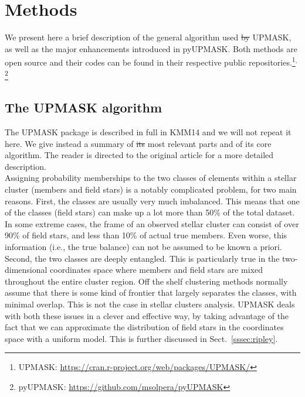 \documentclass[draft]{aa}
\providecommand{\DIFaddtex}[1]{{\protect\color{blue}\uwave{#1}}} %
\providecommand{\DIFdeltex}[1]{{\protect\color{red}\sout{#1}}}                      %
\providecommand{\DIFaddbegin}{} %
\providecommand{\DIFaddend}{} %
\providecommand{\DIFdelbegin}{} %
\providecommand{\DIFdelend}{} %
\providecommand{\DIFadd}[1]{\texorpdfstring{\DIFaddtex{#1}}{#1}} %
\providecommand{\DIFdel}[1]{\texorpdfstring{\DIFdeltex{#1}}{}} %
\newcommand{\DIFscaledelfig}{0.5}
\newlength{\DIFdelgraphicswidth} %
\newlength{\DIFdelgraphicsheight} %
\newcommand{\DIFaddincludegraphics}[2][]{{\color{blue}\fbox{\DIFOincludegraphics[#1]{#2}}}} %
\newcommand{\DIFdelincludegraphics}[2][]{%
\sbox{\DIFdelgraphicsbox}{\DIFOincludegraphics[#1]{#2}}%
\settoboxwidth{\DIFdelgraphicswidth}{\DIFdelgraphicsbox} %
\settoboxtotalheight{\DIFdelgraphicsheight}{\DIFdelgraphicsbox} %
\scalebox{\DIFscaledelfig}{%
\parbox[b]{\DIFdelgraphicswidth}{\usebox{\DIFdelgraphicsbox}\\[-\baselineskip] \rule{\DIFdelgraphicswidth}{0em}}\llap{\resizebox{\DIFdelgraphicswidth}{\DIFdelgraphicsheight}{%
\setlength{\unitlength}{\DIFdelgraphicswidth}%
\begin{picture}(1,1)%
\thicklines\linethickness{2pt} %
{\color[rgb]{1,0,0}\put(0,0){\framebox(1,1){}}}%
{\color[rgb]{1,0,0}\put(0,0){\line( 1,1){1}}}%
{\color[rgb]{1,0,0}\put(0,1){\line(1,-1){1}}}%
\end{picture}%
}\hspace*{3pt}}} %
} %
\DeclareRobustCommand{\DIFaddbegin}{\DIFOaddbegin \let\includegraphics\DIFaddincludegraphics} %
\DeclareRobustCommand{\DIFaddend}{\DIFOaddend \let\includegraphics\DIFOincludegraphics} %
\DeclareRobustCommand{\DIFdelbegin}{\DIFOdelbegin \let\includegraphics\DIFdelincludegraphics} %
\DeclareRobustCommand{\DIFdelend}{\DIFOaddend \let\includegraphics\DIFOincludegraphics} %
\begin{document}
\section{Methods}
 \label{sec:methods}

 We present here a brief description of the general algorithm used \DIFdelbegin \DIFdel{by }\DIFdelend \DIFaddbegin \DIFadd{in }\DIFaddend UPMASK,
 as well as the major enhancements introduced in pyUPMASK.
 Both methods are open source and their codes can be found in their
 respective public repositories.\footnote{UPMASK: 
 \DIFdelbegin %
\DIFdelend \DIFaddbegin \url{https://cran.r-project.org/web/packages/UPMASK/}\DIFaddend }$^{,}$\footnote{pyUPMASK:
 \url{https://github.com/msolpera/pyUPMASK}} %



\subsection{The UPMASK algorithm}
 \label{ssec:upmask}

 The UPMASK package is described in full in KMM14 and we will not repeat it
 here. We give instead a summary of \DIFdelbegin \DIFdel{its }\DIFdelend \DIFaddbegin \DIFadd{the }\DIFaddend most relevant parts and of its core
 algorithm. The reader is directed to the original article for a more detailed
 description.\\

 Assigning probability memberships to the two classes of elements within a 
 stellar cluster \DIFaddbegin \DIFadd{field }\DIFaddend (members and field stars) is a notably complicated
 problem, for two main reasons. First, the classes are usually very much
 imbalanced. This means that one of the classes (field stars) can make up a
 lot more than 50\% of the total dataset. In some extreme cases, the frame of
 an observed stellar cluster can consist of over 90\% of field stars, and less
 than 10\% of actual true members. Even worse, this information (i.e., the
 true balance) can not be assumed to be known a priori.
 Second, the two classes are deeply entangled. This is particularly true in the
 two-dimensional coordinates space where members and field stars are mixed
 throughout the entire cluster region. Off the shelf clustering methods
 normally assume that there is some kind of frontier that largely separates
 the classes, with minimal overlap. This is not the case in stellar clusters
 analysis.
 UPMASK deals with both these issues in a clever and effective way, by taking
 advantage of the fact that we can approximate the distribution of field stars
 in the coordinates space with a uniform model. This is further discussed
 in Sect.~\ref{sssec:ripley}.\\
\end{document}
